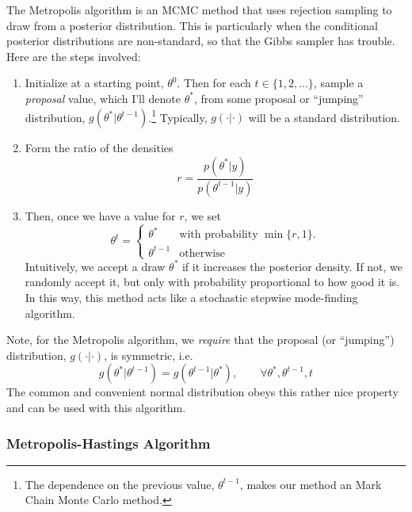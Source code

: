 \documentclass[12pt]{article}
\theoremstyle{plain}
\theoremstyle{definition}
\theoremstyle{remark}
\begin{document}
The Metropolis algorithm is an MCMC method that uses rejection
sampling to draw from a posterior distribution. This is particularly
when the conditional posterior distributions are non-standard, so
that the Gibbs sampler has trouble. Here are the steps involved:
\begin{enumerate}
   \item Initialize at a starting point, $\theta^0$.
      Then for each $t \in \{1, 2, \ldots\}$,
      sample a \emph{proposal} value, which I'll denote
      $\theta^*$, from some proposal or ``jumping'' distribution,
      $g(\theta^* | \theta^{t-1})$.\footnote{The
      dependence on the previous value, $\theta^{t-1}$, makes
      our method an Mark Chain Monte Carlo method.}
      Typically, $g(\cdot | \cdot)$ will be a standard distribution.
   \item Form the ratio of the densities
      \begin{equation}
	 \label{metalg}
	 r = \frac{p(\theta^* | y)}{p(\theta^{t-1} | y)}
      \end{equation}
   \item Then, once we have a value for $r$, we set
      \begin{equation}
	 \label{accept}
	  \theta^t = \begin{cases} \theta^* & \text{with probability
	    $\min\{r,1\}$.} \\ \theta^{t-1} & \text{otherwise}
	 \end{cases}
      \end{equation}
      Intuitively, we accept a draw $\theta^*$ if it increases
      the posterior density. If not, we randomly accept
      it, but only with probability proportional to how good it is.
      In this way, this method acts like a stochastic
      stepwise mode-finding algorithm.
\end{enumerate}
Note, for the Metropolis algorithm, we \emph{require} that the
proposal (or ``jumping'') distribution, $g(\cdot | \cdot)$, is
symmetric, i.e.
\[ g(\theta^* | \theta^{t-1}) = g( \theta^{t-1} |\theta^* ),
   \qquad \forall \theta^*, \theta^{t-1}, t  \]
The common and convenient normal distribution obeys this rather nice
property and can be used with this algorithm.

\subsubsection{Metropolis-Hastings Algorithm}
\end{document}
